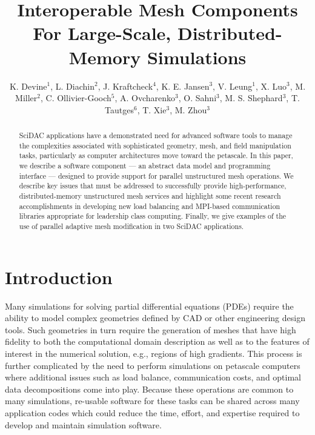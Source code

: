 \documentclass[letterpaper]{jpconf}
\begin{document}
\title{Interoperable Mesh Components For Large-Scale, Distributed-Memory Simulations}
\author{K. Devine$^1$, L. Diachin$^2$, J. Kraftcheck$^4$, 
        K. E. Jansen$^3$, V. Leung$^1$, X. Luo$^3$, M. Miller$^2$,
        C. Ollivier-Gooch$^5$, A. Ovcharenko$^3$, 
        O. Sahni$^3$, M. S. Shephard$^3$,
        T. Tautges$^6$, T. Xie$^3$, M. Zhou$^3$}
\address{$^1$ Sandia National Labs, Albuquerque, NM,
	 $^2$ Lawrence Livermore National Lab, Livermore, CA,
         $^3$ Rensselaer Polytechnic Institute, Troy, NY, 
         $^4$ University of Wisconsin, Madison, WI,
         $^5$ University of British Columbia, Vancouver, BC,
         $^6$ Argonne National Laboratory, Argonne, IL}

\begin{abstract}
SciDAC applications have a demonstrated need for advanced software
tools to manage the complexities associated with sophisticated
geometry, mesh, and field manipulation tasks, particularly as computer
architectures move toward the petascale. In this paper, we describe a
software component --- an abstract data model and programming
interface --- designed to provide support for parallel unstructured
mesh operations.  We describe key issues that must be addressed to
successfully provide high-performance, distributed-memory unstructured
mesh services and highlight some recent research accomplishments in
developing new load balancing and MPI-based communication libraries
appropriate for leadership class computing.  Finally, we give examples
of the use of parallel adaptive mesh modification in two SciDAC
applications.
\end{abstract}

\section{Introduction}
\label{sec:intro}

Many simulations for solving partial differential equations (PDEs)
require the ability to model complex geometries defined by CAD or
other engineering design tools.  Such geometries in turn require 
the generation of meshes that have high fidelity to both
the computational domain description as well as to the features of
interest in the numerical solution, e.g., regions of high gradients.
This process is further complicated by the need to perform simulations
on petascale computers where additional issues such as load balance,
communication costs, and optimal data decompositions come into play.
Because these operations are common to many simulations, re-usable
software for these tasks can be shared across many application codes
which could reduce the time, effort, and expertise
required to develop and maintain simulation software.
\end{document}
